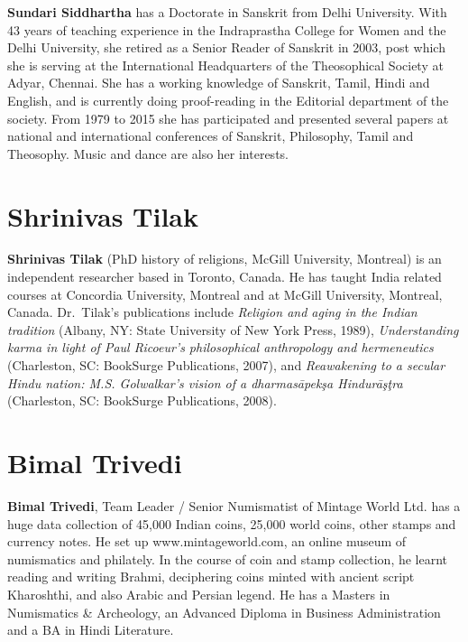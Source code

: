 \textbf{Sundari Siddhartha} has a Doctorate in Sanskrit from Delhi University. With 43 years of teaching experience in the Indraprastha College for Women and the Delhi University, she retired as a Senior Reader of Sanskrit in 2003, post which she is serving at the International Headquarters of the Theosophical Society at Adyar, Chennai. She has a working knowledge of Sanskrit, Tamil, Hindi and English, and is currently doing proof-reading in the Editorial department of the society. From 1979 to 2015 she has participated and presented several papers at national and international conferences of Sanskrit, Philosophy, Tamil and Theosophy. Music and dance are also her interests.

\section*{Shrinivas Tilak}

\vskip -2pt

\textbf{Shrinivas Tilak} (PhD history of religions, McGill University, Montreal) is an independent researcher based in Toronto, Canada. He has taught India related courses at Concordia University, Montreal and at McGill University, Montreal, Canada. Dr.\ Tilak’s publications include \textit{Religion and aging in the Indian tradition} (Albany, NY: State University of New York Press, 1989), \textit{Understanding karma in light of Paul Ricoeur’s philosophical anthropology and hermeneutics} (Charleston, SC: BookSurge Publications, 2007), and \textit{Reawakening to a secular Hindu nation: M.S. Golwalkar’s vision of a dharmasāpekşa Hindurāşţra} (Charleston, SC: BookSurge Publications, 2008).

\section*{Bimal Trivedi}

\vskip -2pt

\textbf{Bimal Trivedi}, Team Leader / Senior Numismatist of Mintage World Ltd. has a huge data collection of 45,000 Indian coins, 25,000 world coins, other stamps and currency notes. He set up www.mintageworld.com, an online museum of numismatics and philately. In the course of coin and stamp collection, he learnt reading and writing Brahmi, deciphering coins minted with ancient script Kharoshthi, and also Arabic and Persian legend. He has a Masters in Numismatics \& Archeology, an Advanced Diploma in Business Administration and a BA in Hindi Literature.

